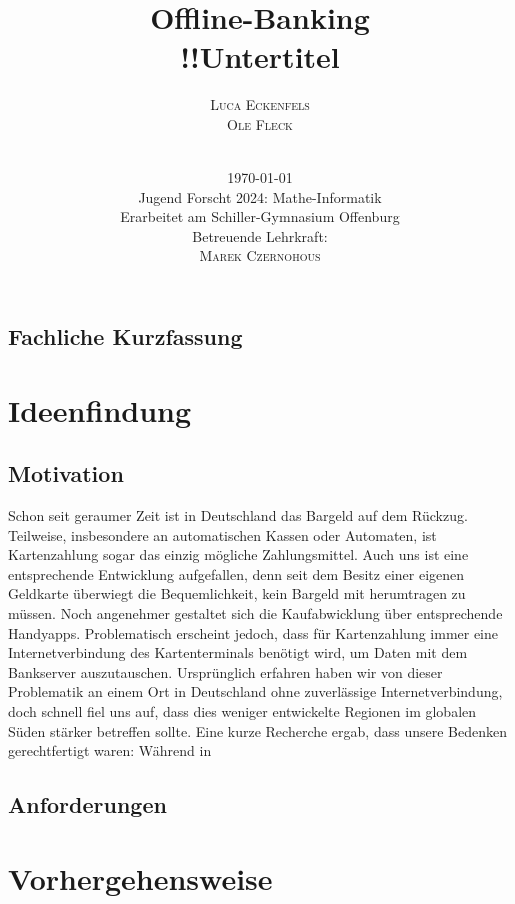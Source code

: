\documentclass[a4paper,12pt,ngerman]{scrreport}
\title{Offline-Banking\\
    \vspace{6mm}
    \large{!!Untertitel}}
\author{\Large{\textsc{Luca Eckenfels}}\\\textsc{Ole Fleck}\\
    \vspace{5cm}\\
\date{\today\\\vspace{12mm}
Jugend Forscht 2024: Mathe-Informatik\\\vspace{6mm}
    Erarbeitet am Schiller-Gymnasium Offenburg\\
Betreuende Lehrkraft: \\\textsc{Marek Czernohous}}
}
\begin{document}


    \maketitle
    \tableofcontents
    \newpage
    \section*{Fachliche Kurzfassung}

    \chapter{Ideenfindung}\label{ch:einleitung}
    \section{Motivation}
    Schon seit geraumer Zeit ist in Deutschland das Bargeld auf dem Rückzug.
    Teilweise, insbesondere an automatischen Kassen oder Automaten, ist Kartenzahlung sogar das einzig mögliche Zahlungsmittel.
    Auch uns ist eine entsprechende Entwicklung aufgefallen, denn seit dem Besitz einer eigenen Geldkarte überwiegt die Bequemlichkeit, kein Bargeld mit herumtragen zu müssen.
    Noch angenehmer gestaltet sich die Kaufabwicklung über entsprechende Handyapps.
    Problematisch erscheint jedoch, dass für Kartenzahlung immer eine Internetverbindung des Kartenterminals benötigt wird, um Daten mit dem Bankserver auszutauschen.
    Ursprünglich erfahren haben wir von dieser Problematik an einem Ort in Deutschland ohne zuverlässige Internetverbindung, doch schnell fiel uns auf, dass dies weniger entwickelte Regionen im globalen Süden stärker betreffen sollte.
    Eine kurze Recherche ergab, dass unsere Bedenken gerechtfertigt waren:
    Während in

    \section{Anforderungen}

    \chapter{Vorhergehensweise}\label{ch:umsetzung}
\end{document}
